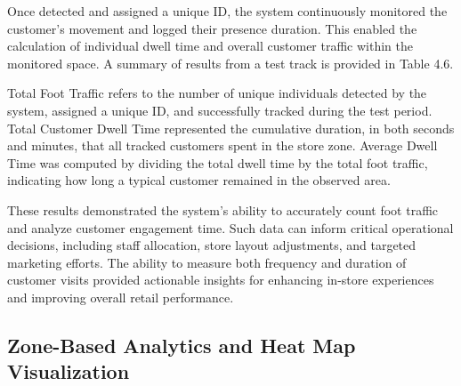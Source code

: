 {Once detected and assigned a unique ID, the system continuously monitored the customer’s movement and logged their presence duration. This enabled the calculation of individual dwell time and overall customer traffic within the monitored space. A summary of results from a test track is provided in Table 4.6.

Total Foot Traffic refers to the number of unique individuals detected by the system, assigned a unique ID, and successfully tracked during the test period. Total Customer Dwell Time represented the cumulative duration, in both seconds and minutes, that all tracked customers spent in the store zone. Average Dwell Time was computed by dividing the total dwell time by the total foot traffic, indicating how long a typical customer remained in the observed area.

\begin{table}[H]
	\begin{doublespace}
		\centering
		\caption[Summary of Customer Count and Dwell Time Based on Test Track]{\newline \newline Summary of Customer Count and Dwell Time Based on Test Track}
	\end{doublespace}
\end{table}

These results demonstrated the system’s ability to accurately count foot traffic and analyze customer engagement time. Such data can inform critical operational decisions, including staff allocation, store layout adjustments, and targeted marketing efforts. The ability to measure both frequency and duration of customer visits provided actionable insights for enhancing in-store experiences and improving overall retail performance.

\subsection{Zone-Based Analytics and Heat Map Visualization}

}
